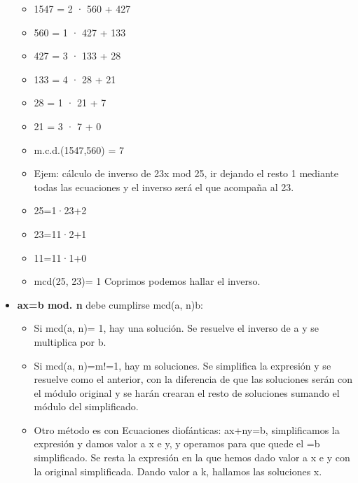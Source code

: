 \documentclass[12pt, twoside, openright]{report} %
\begin{document}
\begin{itemize}
\begin{itemize}
    \item 1547 = 2 · 560 + 427
      
    \item 560 = 1 · 427 + 133
      
    \item 427 = 3 · 133 + 28
      
    \item 133 = 4 · 28 + 21
      
    \item 28 = 1 · 21 + 7
      
    \item 21 = 3 · 7 + 0
      
    \item m.c.d.(1547,560) = 7
      
    \item Ejem: cálculo de inverso de 23x mod 25, ir dejando el resto 1
      mediante todas las ecuaciones y el inverso será el que acompaña al
      23.
      
    \item 25=1·23+2
      
    \item 23=11·2+1
      
    \item 11=11·1+0
      
    \item mcd(25, 23)= 1 Coprimos podemos hallar el inverso.
      
    \end{itemize}
  \item \textbf{ax=b mod. n} debe cumplirse mcd(a, n)\textbar b:
    

    \begin{itemize}
    \item Si mcd(a, n)= 1, hay una solución. Se resuelve el inverso de a y
      se multiplica por b.
      
    \item Si mcd(a, n)=m!=1, hay m soluciones. Se simplifica la expresión y
      se resuelve como el anterior, con la diferencia de que las
      soluciones serán con el módulo original y se harán crearan el
      resto de soluciones sumando el módulo del simplificado.
      
    \item Otro método es con Ecuaciones diofánticas: ax+ny=b, simplificamos
      la expresión y damos valor a x e y, y operamos para que quede el
      =b simplificado. Se resta la expresión en la que hemos dado valor
      a x e y con la original simplificada. Dando valor a k, hallamos
      las soluciones x.
      

\end{itemize}
\end{itemize}
\end{document}
